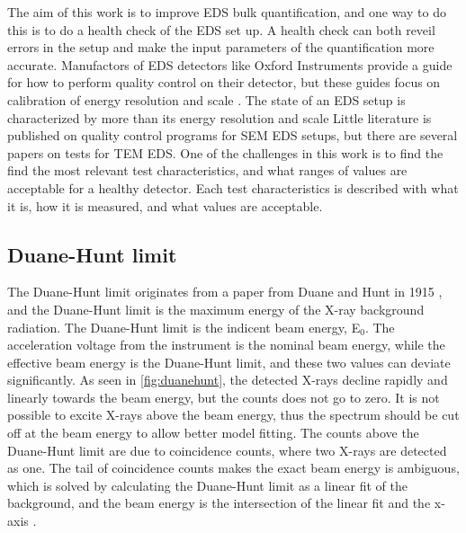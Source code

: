 The aim of this work is to improve EDS bulk quantification, and one way to do this is to do a health check of the EDS set up.
A health check can both reveil errors in the setup and make the input parameters of the quantification more accurate.
Manufactors of EDS detectors like Oxford Instruments provide a guide for how to perform quality control on their detector, but these guides focus on calibration of energy resolution and scale \cite{aztec_manual}.
The state of an EDS setup is characterized by more than its energy resolution and scale \cite{goldstein_scanning_2018}
Little literature is published on quality control programs for SEM EDS setups, but there are several papers on tests for TEM EDS.
One of the challenges in this work is to find the find the most relevant test characteristics, and what ranges of values are acceptable for a healthy detector.
Each test characteristics is described with what it is, how it is measured, and what values are acceptable.



\subsection{Duane-Hunt limit}
\label{theory:qc:duanehunt}

The Duane-Hunt limit originates from a paper from Duane and Hunt in 1915 \cite{Duane_Hunt_1915}, and the Duane-Hunt limit is the maximum energy of the X-ray background radiation.
The Duane-Hunt limit is the indicent beam energy, E$_0$. 
The acceleration voltage from the instrument is the nominal beam energy, while the effective beam energy is the Duane-Hunt limit, and these two values can deviate significantly.
As seen in \cref{fig:duanehunt}, the detected X-rays decline rapidly and linearly towards the beam energy, but the counts does not go to zero.
It is not possible to excite X-rays above the beam energy, thus the spectrum should be cut off at the beam energy to allow better model fitting.
The counts above the Duane-Hunt limit are due to coincidence counts, where two X-rays are detected as one.
The tail of coincidence counts makes the exact beam energy is ambiguous, which is solved by calculating the Duane-Hunt limit as a linear fit of the background, and the beam energy is the intersection of the linear fit and the x-axis \cite{software_dtsaii} \cite[Ch. 9.1.3]{goldstein_scanning_2018}.

